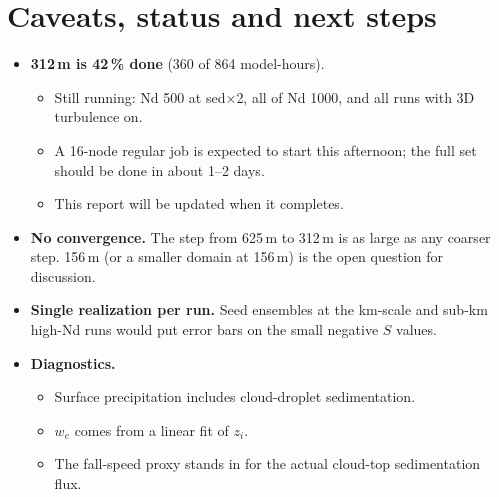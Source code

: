 \documentclass[10pt]{article}
\begin{document}
\section{Caveats, status and next steps}
\begin{itemize}
\item \textbf{312\,m is 42\,\% done} (360 of 864 model-hours).
\begin{itemize}
\item Still running: Nd 500 at sed$\times$2, all of Nd 1000, and all runs with 3D turbulence on.
\item A 16-node regular job is expected to start this afternoon; the full set should be done in about 1--2 days.
\item This report will be updated when it completes.
\end{itemize}
\item \textbf{No convergence.} The step from 625\,m to 312\,m is as large as any coarser step. 156\,m (or a smaller domain at 156\,m) is the open question for discussion.
\item \textbf{Single realization per run.} Seed ensembles at the km-scale and sub-km high-Nd runs would put error bars on the small negative $S$ values.
\item \textbf{Diagnostics.}
\begin{itemize}
\item Surface precipitation includes cloud-droplet sedimentation.
\item $w_e$ comes from a linear fit of $z_i$.
\item The fall-speed proxy stands in for the actual cloud-top sedimentation flux.
\end{itemize}
\end{itemize}
\end{document}
